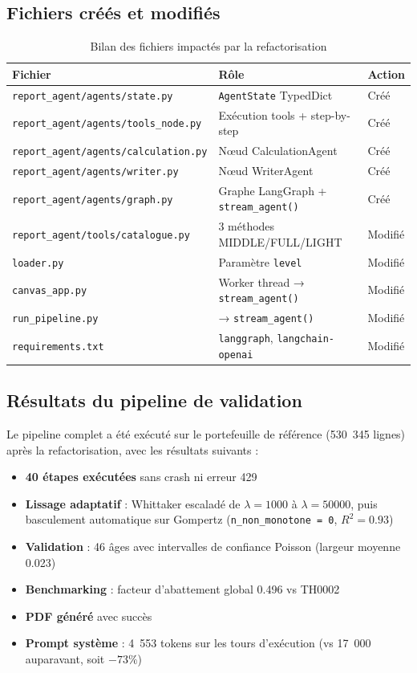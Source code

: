 \documentclass[12pt, a4paper]{article}
\begin{document}
\subsection{Fichiers créés et modifiés}

\begin{table}[h]
\centering
\begin{tabularx}{\textwidth}{lXl}
\toprule
Fichier & Rôle & Action\\
\midrule
\texttt{report\_agent/agents/state.py} & \texttt{AgentState} TypedDict & Créé\\
\texttt{report\_agent/agents/tools\_node.py} & Exécution tools + step-by-step & Créé\\
\texttt{report\_agent/agents/calculation.py} & Nœud CalculationAgent & Créé\\
\texttt{report\_agent/agents/writer.py} & Nœud WriterAgent & Créé\\
\texttt{report\_agent/agents/graph.py} & Graphe LangGraph + \texttt{stream\_agent()} & Créé\\
\texttt{report\_agent/tools/catalogue.py} & 3 méthodes MIDDLE/FULL/LIGHT & Modifié\\
\texttt{loader.py} & Paramètre \texttt{level} & Modifié\\
\texttt{canvas\_app.py} & Worker thread → \texttt{stream\_agent()} & Modifié\\
\texttt{run\_pipeline.py} & → \texttt{stream\_agent()} & Modifié\\
\texttt{requirements.txt} & \texttt{langgraph}, \texttt{langchain-openai} & Modifié\\
\bottomrule
\end{tabularx}
\caption{Bilan des fichiers impactés par la refactorisation}
\end{table}

\subsection{Résultats du pipeline de validation}

Le pipeline complet a été exécuté sur le portefeuille de référence
(530~345 lignes) après la refactorisation, avec les résultats suivants :

\begin{itemize}
  \item \textbf{40 étapes exécutées} sans crash ni erreur 429
  \item \textbf{Lissage adaptatif} : Whittaker escaladé de $\lambda=1000$ à
    $\lambda=50000$, puis basculement automatique sur Gompertz
    (\texttt{n\_non\_monotone = 0}, $R^2 = 0.93$)
  \item \textbf{Validation} : 46 âges avec intervalles de confiance Poisson
    (largeur moyenne 0.023)
  \item \textbf{Benchmarking} : facteur d'abattement global 0.496 vs TH0002
  \item \textbf{PDF généré} avec succès
  \item \textbf{Prompt système} : 4~553 tokens sur les tours d'exécution
    (vs 17~000 auparavant, soit $-73\%$)
\end{itemize}
\end{document}
